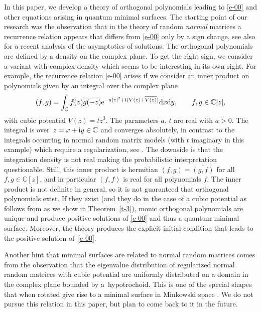 \documentclass[pdftex]{sigma}
\numberwithin{equation}{section}
\theoremstyle{definition}
\begin{document}
In this paper, we develop a theory of orthogonal polynomials leading to \eqref{e-00} and other equations arising in quantum minimal surfaces. The starting point of our research was the observation that in the theory of random {\em normal} matrices \cite{WiegmannZabrodin2000} a recurrence relation appears \cite{TBAZW2005} that differs from \eqref{e-00} only by a sign change,
see also \cite{AptekarevNovokshenov} for a recent analysis of the asymptotics of solutions. The orthogonal polynomials are defined by a density on the complex plane. To get the right sign, we consider a variant with complex density which seems to be interesting in its own right. For example, the recurrence relation \eqref{e-00} arises if we consider an inner product on polynomials given by an integral over the complex plane
\begin{equation}\label{e-ip}
(f,g)=\int_{\mathbb C}f(z)\overline{g(-z)}{\rm e}^{{-a|z|^2+{\rm i} (V(z)+\overline{V(z)})}}{\rm d}x{\rm d}y,\qquad f,g\in\mathbb C[z],
\end{equation}
with cubic potential $V(z)=tz^3$. The parameters $a$, $t$ are real with $a>0$. The integral is over~${z=x+{\rm i}y\in\mathbb C}$ and converges absolutely, in contrast to the integrals occurring in normal random matrix models (with $t$ imaginary in this example) \cite{Elbau2007,TBAZW2005,WiegmannZabrodin2000} which require a regularization, see \cite{BleherKuijlaars2012,ElbauFelder2005}.
The downside is that the integration density is not real making the probabilistic interpretation questionable.
Still, this inner product is hermitian
$
(f,g)=\overline{(g,f)} $ for all $ f,g\in\mathbb C[z]$,
and in particular $(f,f)$ is real for all polynomials $f$.
The inner product is not definite in general, so it is not guaranteed that orthogonal polynomials exist. If they exist (and they do in the case of a cubic potential as follows from \cite{CDHM2025,Hoppe2025} as we show in Theorem~\ref{t-3}), monic orthogonal polynomials are unique and produce positive solutions of \eqref{e-00} and thus a quantum minimal surface. Moreover, the theory produces the explicit initial condition that leads to the positive solution of~\eqref{e-00}.

Another hint that minimal surfaces are related to normal random matrices comes from the observation that the eigenvalue distribution of regularized normal random matrices \cite{ElbauFelder2005,WiegmannZabrodin2000} with cubic potential are uniformly distributed on a domain in the complex plane bounded by a~hypotrochoid. This is one of the special shapes that when rotated give rise to a minimal surface in Minkowski space \cite{Hoppe2009}. We do not pursue this relation in this paper, but plan to come back to it in the future.
\end{document}
